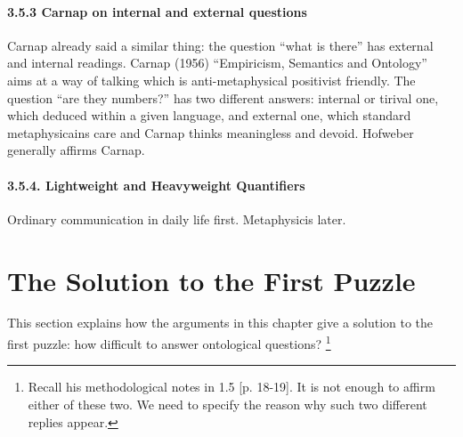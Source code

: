 \documentclass[
10pt, %
a4paper, %
twocolumn, %
landscape %
]{article}
\begin{document}
\paragraph{3.5.3 Carnap on internal and external questions}
Carnap already said a similar thing: the question ``what is there'' has external and internal readings.
Carnap (1956) ``Empiricism, Semantics and Ontology'' aims at a way of talking which is anti-metaphysical positivist friendly.
The question ``are they numbers?'' has two different answers: internal or tirival one, which deduced within a given language, and external one, which standard metaphysicains care and Carnap thinks meaningless and devoid.
Hofweber generally affirms Carnap.

\paragraph{3.5.4. Lightweight and Heavyweight Quantifiers}
Ordinary communication in daily life first. Metaphysicis later.

\section*{The Solution to the First Puzzle}
This section explains how the arguments  in this chapter give a solution to the first puzzle: how difficult to answer ontological questions?
\footnote{Recall his methodological notes in 1.5 [p. 18-19]. It is not enough to affirm either of these two. We need to specify the reason why such two different replies appear.}



\renewcommand{\refname}{Reference} %


\end{document}
